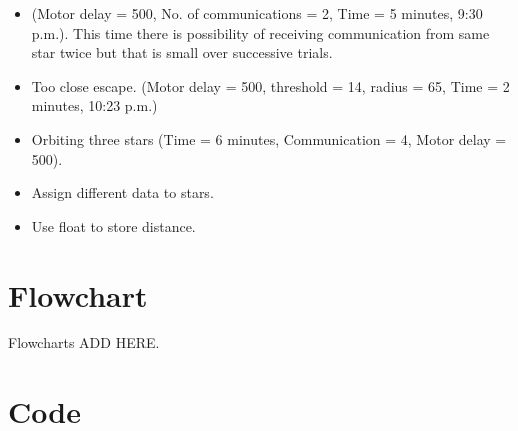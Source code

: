 \documentclass{report}[12pt]
\begin{document}
\begin{itemize}
    \item (Motor delay = 500, No. of communications = 2, Time = 5 minutes, 9:30 p.m.). This time there is possibility of receiving communication from same star twice but that is small over successive trials.
    \item Too close escape. (Motor delay = 500, threshold = 14, radius = 65, Time = 2 minutes, 10:23 p.m.)
    \item Orbiting three stars (Time = 6 minutes, Communication = 4, Motor delay = 500).
    \item Assign different data to stars.
    \item Use float to store distance.
\end{itemize}
\section{Flowchart}
Flowcharts ADD HERE.

\section{Code}


\end{document}
